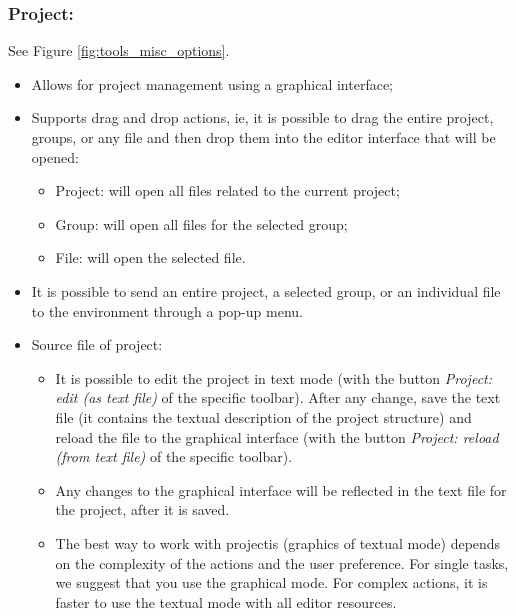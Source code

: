 \hypertarget{working_tools_misc_project}{}
\subsubsection{Project:}

See Figure \ref{fig:tools_misc_options}.

\begin{itemize}
  \item Allows for project management using a graphical interface;
  \item Supports drag and drop actions, ie, it is possible to drag
    the entire project, groups, or any file and then drop them
    into the editor interface that will be opened:
    \begin{itemize}
      \item Project: will open all files related to the current project;
      \item Group: will open all files for the selected group;
      \item File: will open the selected file.
    \end{itemize}
  \item It is possible to send an entire project,
    a selected group, or an individual file to the \RR{} environment through a pop-up menu.
  \item  Source file of project:
    \begin{itemize}
      \item It is possible to edit the project in text mode (with the button
        \textit{Project: edit (as text file)} of the specific toolbar).
        After any change, save the text file (it contains the textual
        description of the project structure) and reload the file to the
        graphical interface (with the button \textit{Project:
          reload (from text file)} of the specific toolbar).
      \item Any changes to the graphical interface will be reflected in the
        text file for the project, after it is saved.
      \item The best way to work with projectis (graphics of textual mode)
        depends on the complexity of the actions and the user preference.
        For single tasks, we suggest that you use the graphical mode.
        For complex actions, it is faster to use the textual mode with
        all editor resources.
    \end{itemize}
\end{itemize}


